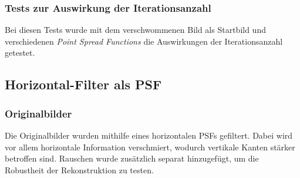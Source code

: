 \subsubsection{Tests zur Auswirkung der Iterationsanzahl}

Bei diesen Tests wurde mit dem verschwommenen Bild als Startbild und verschiedenen \textit{Point Spread Functions} die Auswirkungen der Iterationsanzahl getestet.

\noindent
\begin{minipage}[t]{0.33\textwidth}
\end{minipage}
%
\begin{minipage}[t]{0.33\textwidth}
\end{minipage}
%
\begin{minipage}[t]{0.33\textwidth}
\end{minipage}




\subsection{Horizontal-Filter als PSF}

\subsubsection{Originalbilder}

Die Originalbilder wurden mithilfe eines horizontalen PSFs gefiltert. Dabei wird vor allem horizontale Information verschmiert, wodurch vertikale Kanten stärker betroffen sind. Rauschen wurde zusätzlich separat hinzugefügt, um die Robustheit der Rekonstruktion zu testen.

\noindent
\begin{minipage}[t]{0.33\textwidth}
\end{minipage}
%
\begin{minipage}[t]{0.33\textwidth}
\end{minipage}
%
\begin{minipage}[t]{0.33\textwidth}
\end{minipage}


